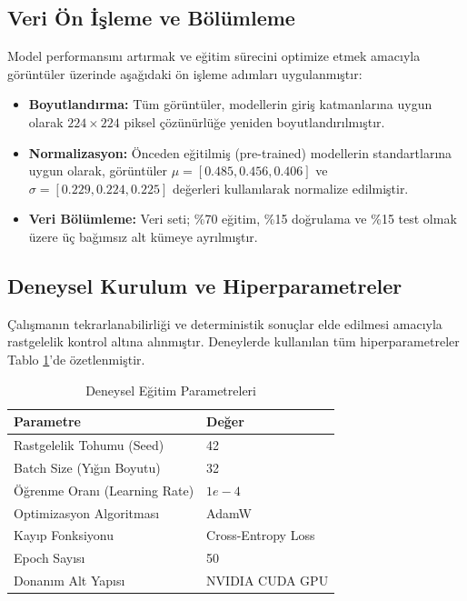 \documentclass[conference]{IEEEtran}
\begin{document}
\subsection{Veri Ön İşleme ve Bölümleme}
Model performansını artırmak ve eğitim sürecini optimize etmek amacıyla görüntüler üzerinde aşağıdaki ön işleme adımları uygulanmıştır:
\begin{itemize}
    \item \textbf{Boyutlandırma:} Tüm görüntüler, modellerin giriş katmanlarına uygun olarak $224 \times 224$ piksel çözünürlüğe yeniden boyutlandırılmıştır.
    \item \textbf{Normalizasyon:} Önceden eğitilmiş (pre-trained) modellerin standartlarına uygun olarak, görüntüler $\mu = [0.485, 0.456, 0.406]$ ve $\sigma = [0.229, 0.224, 0.225]$ değerleri kullanılarak normalize edilmiştir.
    \item \textbf{Veri Bölümleme:} Veri seti; \%70 eğitim, \%15 doğrulama ve \%15 test olmak üzere üç bağımsız alt kümeye ayrılmıştır.
\end{itemize}

\subsection{Deneysel Kurulum ve Hiperparametreler}
Çalışmanın tekrarlanabilirliği ve deterministik sonuçlar elde edilmesi amacıyla rastgelelik kontrol altına alınmıştır. Deneylerde kullanılan tüm hiperparametreler Tablo \ref{tab:hiperparametreler}'de özetlenmiştir.

\begin{table}[htbp]
\caption{Deneysel Eğitim Parametreleri}
\begin{center}
\begin{tabular}{|l|l|}
\hline
\textbf{Parametre} & \textbf{Değer} \\
\hline
Rastgelelik Tohumu (Seed) & 42 \\
Batch Size (Yığın Boyutu) & 32 \\
Öğrenme Oranı (Learning Rate) & $1e-4$ \\
Optimizasyon Algoritması & AdamW \\
Kayıp Fonksiyonu & Cross-Entropy Loss \\
Epoch Sayısı & 50 \\
Donanım Alt Yapısı & NVIDIA CUDA GPU \\
\hline
\end{tabular}
\label{tab:hiperparametreler}
\end{center}
\end{table}
\end{document}

